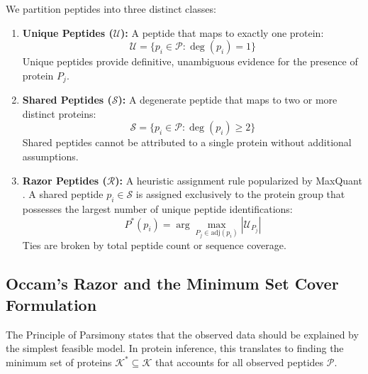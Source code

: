 \documentclass[11pt,twoside,openright]{book}
\begin{document}
We partition peptides into three distinct classes:
\begin{enumerate}
    \item \textbf{Unique Peptides ($\mathcal{U}$):} A peptide that maps to exactly one protein:
    \begin{equation}
    \mathcal{U} = \{p_i \in \mathcal{P} : \deg(p_i) = 1\}
    \label{eq:unique_peptides}
    \end{equation}
    Unique peptides provide definitive, unambiguous evidence for the presence of protein $P_j$.
    
    \item \textbf{Shared Peptides ($\mathcal{S}$):} A degenerate peptide that maps to two or more distinct proteins:
    \begin{equation}
    \mathcal{S} = \{p_i \in \mathcal{P} : \deg(p_i) \ge 2\}
    \label{eq:shared_peptides}
    \end{equation}
    Shared peptides cannot be attributed to a single protein without additional assumptions.
    
    \item \textbf{Razor Peptides ($\mathcal{R}$):} A heuristic assignment rule popularized by MaxQuant \cite{cox2008maxquant, cox2014maxquant, savitski2015measuring}. A shared peptide $p_i \in \mathcal{S}$ is assigned exclusively to the protein group that possesses the largest number of unique peptide identifications:
    \begin{equation}
    P^*(p_i) = \arg\max_{P_j \in \text{adj}(p_i)} |\mathcal{U}_{P_j}|
    \label{eq:razor_rule}
    \end{equation}
    Ties are broken by total peptide count or sequence coverage.
\end{enumerate}

\subsection{Occam's Razor and the Minimum Set Cover Formulation}
The Principle of Parsimony states that the observed data should be explained by the simplest feasible model. In protein inference, this translates to finding the minimum set of proteins $\mathcal{K}^* \subseteq \mathcal{K}$ that accounts for all observed peptides $\mathcal{P}$.
\end{document}
